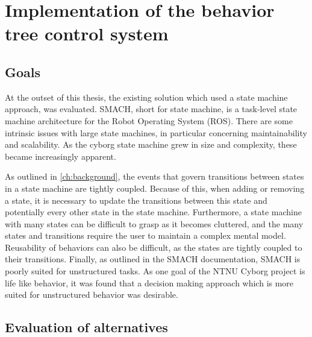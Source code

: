 \documentclass[\rootfolder/main.tex]{subfiles}
\begin{document}
\chapter{Implementation of the behavior tree control system} %

\label{ch:implementation-bt} %


\section{Goals}

At the outset of this thesis, the existing solution which used a state machine approach, was evaluated.
SMACH, short for state machine, is a task-level state machine architecture for the Robot Operating System (ROS).
There are some intrinsic issues with large state machines, in particular concerning maintainability and scalability.
As the cyborg state machine grew in size and complexity, these became increasingly apparent.

As outlined in \cref{ch:background}, the events that govern transitions between states in a state machine are tightly coupled.
Because of this, when adding or removing a state, it is necessary to update the transitions between this state and potentially every other state in the state machine.
Furthermore, a state machine with many states can be difficult to grasp as it becomes cluttered, and the many states and transitions require the user to maintain a complex mental model.
Reusability of behaviors can also be difficult, as the states are tightly coupled to their transitions.
Finally, as outlined in the SMACH documentation, SMACH is poorly suited for unstructured tasks.
As one goal of the NTNU Cyborg project is life like behavior, it was found that a decision making approach which is more suited for unstructured behavior was desirable.


\section{Evaluation of alternatives}
\end{document}
